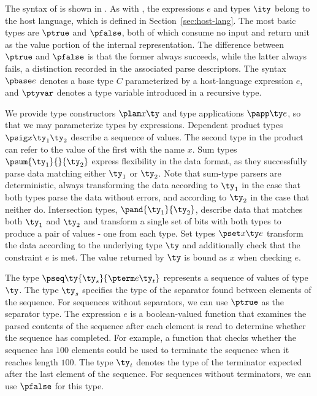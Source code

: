 The syntax of \ddc{} is shown in . As with
\ipads{}, the expressions $e$ and types $\ity$ belong to the host
language, which is defined in Section~\ref{sec:host-lang}.
The most basic types are $\ptrue$ and $\pfalse$, both of which consume
no input and return unit as the value portion of the internal
representation.  The difference between $\ptrue$ and $\pfalse$ is that
the former always succeeds, while the latter always fails, a
distinction recorded in the associated parse descriptors.
The syntax $\pbase e$ denotes a base type $C$ parameterized by a
host-language expression $e$, and $\ptyvar$ denotes a type variable
introduced in a recursive type.

We provide type constructors $\plam x {} \ty$ and type applications
$\papp \ty e$, so that we may parameterize types by expressions.
Dependent product types $\psig x {\ty_1} {\ty_2}$ describe a sequence
of values. The second type in the product can refer to the value of
the first with the name $x$. Sum types $\psum {\ty_1} {} {\ty_2}$
express flexibility in the data format, as they successfully parse
data matching either $\ty_1$ or $\ty_2$. Note that sum-type parsers
are deterministic, always transforming the data according to $\ty_1$
in the case that both types parse the data without errors, and
according to $\ty_2$ in the case that neither do. Intersection types,
$\pand {\ty_1} {\ty_2}$, describe data that matches both $\ty_1$ and
$\ty_2$ and transform a single set of bits with both types to produce
a pair of values - one from each type. Set types $\pset x \ty e$
transform the data according to the underlying type $\ty$ and
additionally check that the constraint $e$ is met.  The value returned
by $\ty$ is bound as $x$ when checking $e$.

The type $\pseq \ty {\ty_s} {\pterm e {\ty_t}}$ represents a sequence
of values of type $\ty$. The type $\ty_s$ specifies the type of
the separator found between elements of the sequence. For sequences
without separators, we can use $\ptrue$ as the separator type.  The
expression $e$ is a boolean-valued function that examines the parsed
contents of the sequence after each element is read to determine
whether the sequence has completed. For example, a function that
checks whether the sequence has $100$ elements could be used to
terminate the sequence when it reaches length $100$.  The type 
$\ty_t$ denotes the type of the terminator expected after the last
element of the sequence. For sequences without terminators, we can use
$\pfalse$ for this type.

